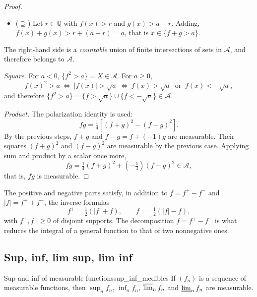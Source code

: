 \documentclass[11pt, a4paper]{article}
\begin{document}
\begin{proof}
\begin{itemize}
    \item ($\supseteq$) Let $r \in \mathbb{Q}$ with $f(x) > r$ and $g(x) > a - r$. Adding, $f(x) +
    g(x) > r + (a - r) = a$, that is $x \in \{f + g > a\}$.
\end{itemize}
The right-hand side is a \emph{countable} union of
finite intersections of sets in $\mathcal{A}$, and therefore belongs to $\mathcal{A}$.

\textit{Square.} For $a < 0$, $\{f^2 > a\} = X \in \mathcal{A}$. For $a \ge 0$,
$$ f(x)^2 > a \ \Leftrightarrow \ |f(x)| > \sqrt{a} \ \Leftrightarrow \ f(x) > \sqrt{a} \ \text{ or }
\ f(x) < -\sqrt{a}, $$
and therefore $\{f^2 > a\} = \{f > \sqrt{a}\} \cup \{f < -\sqrt{a}\} \in \mathcal{A}$.

\textit{Product.} The polarization identity is used:
$$ fg = \tfrac{1}{4} \left[ (f + g)^2 - (f - g)^2 \right]. $$
By the previous steps, $f + g$ and $f - g = f + (-1) g$ are measurable.
Their squares $(f + g)^2$ and $(f - g)^2$ are measurable by the previous case. Applying sum and
product by a scalar once more,
$$ fg = \tfrac{1}{4}(f + g)^2 + \left(-\tfrac{1}{4}\right)(f - g)^2 \in \mathcal{A}, $$
that is, $fg$ is measurable.
\end{proof}

\obs The positive and negative parts satisfy, in addition to $f = f^+ - f^-$ and $|f| = f^+ + f^-$,
the inverse formulas
$$ f^+ = \tfrac{1}{2}(|f| + f), \qquad f^- = \tfrac{1}{2}(|f| - f), $$
with $f^+, f^- \ge 0$ of disjoint supports. The decomposition $f = f^+ - f^-$ is what reduces
the integral of a general function to that of two nonnegative ones.

\subsection{Sup, inf, lim sup, lim inf}

\begin{teorema}{Sup and inf of measurable functions}{sup_inf_medibles}
If $(f_n)$ is a sequence of measurable functions, then $\sup_n f_n$, $\inf_n f_n$,
$\varlimsup_n f_n$ and $\varliminf_n f_n$ are measurable.
\end{teorema}
\end{document}
